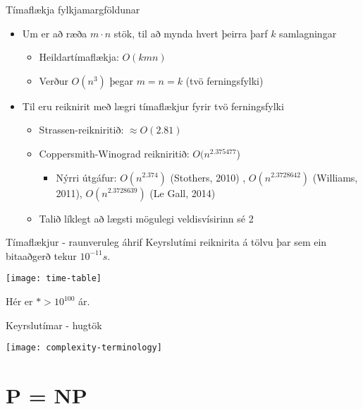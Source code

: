 \documentclass[handout]{beamer}
\begin{document}
\begin{frame}{Tímaflækja fylkjamargföldunar}
\begin{itemize}
 \item Um er að ræða $m \cdot n$ stök, til að mynda hvert þeirra þarf $k$ samlagningar \pause
 \begin{itemize}
  \item Heildartímaflækja: $O(kmn)$
  \item Verður $O(n^3)$ þegar $m = n = k$ (tvö ferningsfylki)
 \end{itemize}\pause
 \item Til eru reiknirit með lægri tímaflækjur fyrir tvö ferningsfylki
 \begin{itemize}
  \item Strassen-reikniritið: $\approx O(2.81)$
  \item Coppersmith-Winograd reikniritið: $O(n^{2.375477}$) \pause
  \begin{itemize}
   \item Nýrri útgáfur: $O(n^{2.374})$ (Stothers, 2010) \pause, $O(n^{2.3728642})$ (Williams, 2011), \pause $O(n^{2.3728639})$ (Le Gall, 2014)
  \end{itemize}
  \item Talið líklegt að lægsti mögulegi veldisvísirinn sé 2
 \end{itemize}
\end{itemize}
\end{frame}

\begin{frame}{Tímaflækjur - raunveruleg áhrif}
Keyrslutími reiknirita á tölvu þar sem ein bitaaðgerð tekur $10^{-11}s$.
\begin{center}
\texttt{[image: time-table]}
\end{center}
Hér er $* > 10^{100}$ ár.
\end{frame}

\begin{frame}{Keyrslutímar - hugtök}
\begin{center}
\texttt{[image: complexity-terminology]}
\end{center}
\end{frame}


\section{P = NP}
\end{document}
